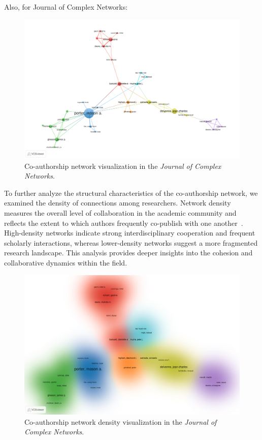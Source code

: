 \documentclass[twocolumn]{article}
\begin{document}
		Also, for Journal of Complex Networks: 
		
		\begin{figure}[htbp]
			\centering
			\includegraphics[width=\columnwidth]{Journal of Complex Networks/VOS/co-authorship.pdf}
			\caption{Co-authorship network visualization in the \textit{Journal of Complex Networks}.}
			\label{fig.fig12}
		\end{figure}
		
		To further analyze the structural characteristics of the co-authorship network, we examined the density of connections among researchers. Network density measures the overall level of collaboration in the academic community and reflects the extent to which authors frequently co-publish with one another~\cite{newman2001scientific, moody2004sociology, barabasi2016network}. High-density networks indicate strong interdisciplinary cooperation and frequent scholarly interactions, whereas lower-density networks suggest a more fragmented research landscape. This analysis provides deeper insights into the cohesion and collaborative dynamics within the field.
		
		
		\begin{figure}[htbp]
			\centering
			\includegraphics[width=\columnwidth]{Journal of Complex Networks/VOS/co-authorship-density.pdf}
			\caption{Co-authorship network density visualization in the \textit{Journal of Complex Networks}.}
			\label{fig.fig17}
		\end{figure}
		
\end{document}
